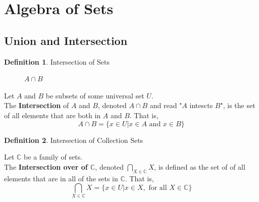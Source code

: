 \documentclass{book}
\theoremstyle{definition}
\newtheorem{definition}{Definition}[section]
\theoremstyle{remark}
\newcommand{\bb}[1]{\mathbb{#1}}
\begin{document}
\newpage
\section{Algebra of Sets}
\subsection{Union and Intersection}
\begin{definition}
Intersection of Sets \\

\begin{figure}[H]
    \centering
        \def \setA{ (0,0) circle (1cm) }
        \def \setB{ (1.5,0) circle (1cm) }
        \def \myrectangle{ (-2, -1.5) rectangle (3.5, 1.5) }
            \begin{center}
            \end{center}
    \caption{$A \cap B$}
    \label{fig:AcapB}
\end{figure}

\begin{tcolorbox}
    Let $A$ and $B$ be subsets of some universal set $U$. \\
    The \textbf{Intersection} of $A$ and $B$, denoted $A \cap B$ and read "$A$ intescts $B$", is the set of all elements that are both in $A$ and $B$. That is,
        \begin{equation*}
            A \cap B = \{x \in U | x \in A \text{ and } x \in B \}
        \end{equation*}
\end{tcolorbox}
\end{definition}



\begin{definition}
Intersection of Collection Sets \\

\begin{tcolorbox}
    Let $\bb{C}$ be a family of sets. \\
    The \textbf{Intersection over of $\bb{C}$}, denoted $\bigcap_{X \in \bb{C}}{X}$, is defined as the set of of all elements that are in all of the sets in $\bb{C}$. That is,  
        \begin{equation*}
            \bigcap_{X \in \bb{C}}{X} = \{x \in U | x \in X, \text{ for all } X \in \bb{C} \}
        \end{equation*}
\end{tcolorbox}
\end{definition}
\end{document}

